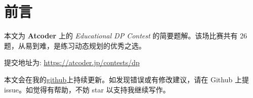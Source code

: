 \maketitle
\tableofcontents
\newpage
\section*{前言}

本文为 \textbf{Atcoder} 上的 \emph{Educational DP Contest} 的简要题解。该场比赛共有 26 题，从易到难，是练习动态规划的优秀之选。

提交地址为: \url{ https://atcoder.jp/contests/dp}


本文会在我的\href{https://github.com/SamZhangQingChuan/Atcoder-Educational-DP-Contest-Editorial}{github}上持续更新。如发现错误或有修改建议，请在 Github 上提 issue。如觉得有帮助，不妨 star 以支持我继续写作。

\newpage

